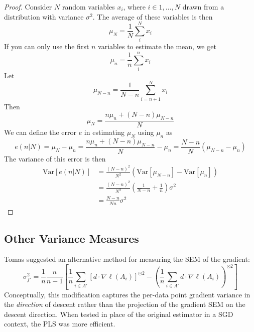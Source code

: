 \documentclass{article}
\begin{document}
\begin{proof}
Consider $N$ random variables $x_i$, where $i\in 1,\ldots,N$ drawn from a distribution with variance $\sigma^2$. The average of these variables is then 
\[ \mu_N = \frac{1}{N}\sum_i^N x_i \]
If you can only use the first $n$ variables to estimate the mean, we get 
\[ \mu_n = \frac{1}{n}\sum_i^n x_i \]
Let 
\[\mu_{N-n} = \frac{1}{N-n}\sum_{i=n+1}^N x_i\]
Then
\[ \mu_N = \frac{n \mu_n + (N-n)\mu_{N-n}}{N} \]
We can define the error $e$ in estimating $\mu_N$ using $\mu_n$ as
\[ e(n|N) = \mu_N-\mu_n = \frac{n\mu_n + (N-n)\mu_{N-n}}{N}-\mu_n = \frac{N-n}{N}(\mu_{N-n}-\mu_n)\]
The variance of this error is then 
\begin{align*}
\text{Var}[e(n|N)] &= \frac{(N-n)^2}{N^2}\left( \text{Var}[\mu_{N-n}] - \text{Var}[\mu_n] \right) \\
&= \frac{(N-n)^2}{N^2} \left(\frac{1}{N-n} +\frac{1}{n} \right) \sigma^2 \\
&= \frac{N-n}{Nn}\sigma^2
\end{align*}
\end{proof}
\subsection{Other Variance Measures}
Tomas suggested an alternative method for measuring the SEM of the gradient: 
\begin{equation}
\label{eq:sdf_tomas} \sigma_{f'}^2 = \frac{1}{n}\frac{n}{n-1} \left[ \frac{1}{n} \sum_{i \in A'} \left[d \cdot \nabla \ell(A_i) \right]^{\odot 2} - \left(\frac{1}{n} \sum_{i \in A'} d\cdot\nabla \ell(A_i) \right)^{\odot 2} \right]
\end{equation}
Conceptually, this modification captures the per-data point gradient variance in the \emph{direction} of descent rather than the projection of the gradient SEM on the descent direction. When tested in place of the original estimator in a SGD context, the PLS was more efficient. 
\end{document}
